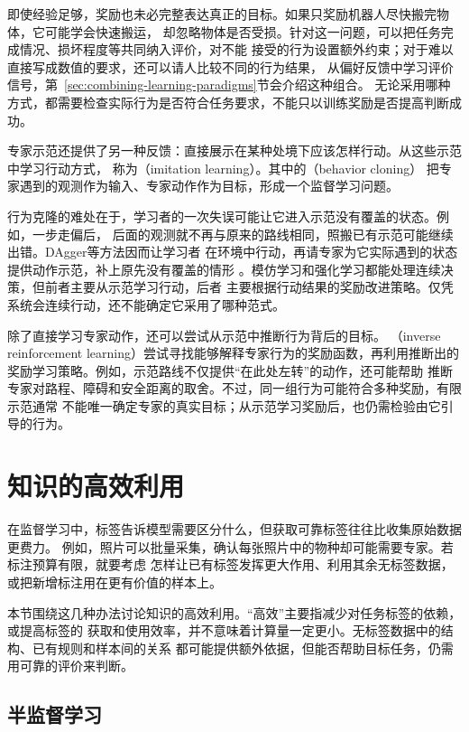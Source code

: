 即使经验足够，奖励也未必完整表达真正的目标。如果只奖励机器人尽快搬完物体，它可能学会快速搬运，
却忽略物体是否受损。针对这一问题，可以把任务完成情况、损坏程度等共同纳入评价，对不能
接受的行为设置额外约束；对于难以直接写成数值的要求，还可以请人比较不同的行为结果，
从偏好反馈中学习评价信号，第~\ref{sec:combining-learning-paradigms}节会介绍这种组合。
无论采用哪种方式，都需要检查实际行为是否符合任务要求，不能只以训练奖励是否提高判断成功。

专家示范还提供了另一种反馈：直接展示在某种处境下应该怎样行动。从这些示范中学习行动方式，
称为（imitation learning）。其中的（behavior cloning）
把专家遇到的观测作为输入、专家动作作为目标，形成一个监督学习问题。

行为克隆的难处在于，学习者的一次失误可能让它进入示范没有覆盖的状态。例如，一步走偏后，
后面的观测就不再与原来的路线相同，照搬已有示范可能继续出错。DAgger等方法因而让学习者
在环境中行动，再请专家为它实际遇到的状态提供动作示范，补上原先没有覆盖的情形
。模仿学习和强化学习都能处理连续决策，但前者主要从示范学习行动，后者
主要根据行动结果的奖励改进策略。仅凭系统会连续行动，还不能确定它采用了哪种范式。

除了直接学习专家动作，还可以尝试从示范中推断行为背后的目标。
（inverse reinforcement learning）尝试寻找能够解释专家行为的奖励函数，再利用推断出的
奖励学习策略。例如，示范路线不仅提供“在此处左转”的动作，还可能帮助
推断专家对路程、障碍和安全距离的取舍。不过，同一组行为可能符合多种奖励，有限示范通常
不能唯一确定专家的真实目标；从示范学习奖励后，也仍需检验由它引导的行为。

\section{知识的高效利用}
\label{sec:efficient-knowledge-use-overview}

在监督学习中，标签告诉模型需要区分什么，但获取可靠标签往往比收集原始数据更费力。
例如，照片可以批量采集，确认每张照片中的物种却可能需要专家。若标注预算有限，就要考虑
怎样让已有标签发挥更大作用、利用其余无标签数据，或把新增标注用在更有价值的样本上。

本节围绕这几种办法讨论知识的高效利用。“高效”主要指减少对任务标签的依赖，或提高标签的
获取和使用效率，并不意味着计算量一定更小。无标签数据中的结构、已有规则和样本间的关系
都可能提供额外依据，但能否帮助目标任务，仍需用可靠的评价来判断。

\subsection{半监督学习}
\label{sec:semi-supervised-learning}

